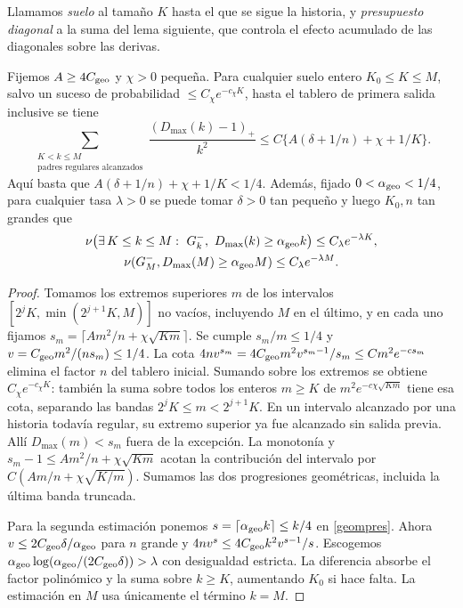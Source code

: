 Llamamos \emph{suelo} al tamaño $K$ hasta el que se sigue la historia, y \emph{presupuesto diagonal}
a la suma del lema siguiente, que controla el efecto acumulado de las diagonales sobre las derivas.
\begin{lema}\label{lema:presupuesto-meso}
Fijemos $A\ge4C_{\rm geo}$ y $\chi>0$ pequeña. Para cualquier suelo entero $K_0\le K\le M$, salvo un
suceso de probabilidad $\le C_\chi e^{-c_\chi K}$, hasta el tablero de primera salida inclusive se
tiene
\[
 \sum_{\substack{K<k\le M\\\text{padres regulares alcanzados}}}
          \frac{(D_{\max}(k)-1)_+}{k^2}
 \le C\{A(\delta+1/n)+\chi+1/K\}.
\]
Aquí basta que $A(\delta+1/n)+\chi+1/K<1/4$. Además, fijado $0<\alpha_{\rm geo}<1/4$, para cualquier tasa
$\lambda>0$ se puede tomar $\delta>0$ tan pequeño y luego $K_0,n$ tan grandes que
\begin{gather*}
 \nu\big(\exists\,K\le k\le M:\ G_k^-,\ D_{\max}(k)\ge\alpha_{\rm geo} k\big)
 \le C_\lambda e^{-\lambda K},\\
 \nu(G_M^-,D_{\max}(M)\ge\alpha_{\rm geo} M)\le C_\lambda e^{-\lambda M}.
\end{gather*}
\end{lema}
\begin{proof}
Tomamos los extremos superiores $m$ de los intervalos $[2^jK,\min(2^{j+1}K,M)]$ no vacíos, incluyendo
$M$ en el último, y en cada uno fijamos $s_m=\lceil Am^2/n+\chi\sqrt{Km}\rceil$. Se cumple
$s_m/m\le1/4$ y $v=C_{\rm geo}m^2/(ns_m)\le1/4$. La cota
$4nv^{s_m}=4C_{\rm geo}m^2v^{s_m-1}/s_m\le C m^2e^{-c s_m}$
elimina el factor $n$ del tablero inicial. Sumando sobre los extremos se obtiene
$C_\chi e^{-c_\chi K}$: también la suma sobre todos los enteros $m\ge K$ de
$m^2e^{-c\chi\sqrt{Km}}$ tiene esa cota,
separando las bandas $2^jK\le m<2^{j+1}K$. En un intervalo alcanzado por una historia todavía regular,
su extremo superior ya fue alcanzado sin salida previa. Allí $D_{\max}(m)<s_m$ fuera de la excepción.
La monotonía y $s_m-1\le Am^2/n+\chi\sqrt{Km}$ acotan la contribución del intervalo por
$C(Am/n+\chi\sqrt{K/m})$. Sumamos las dos progresiones geométricas, incluida la última banda
truncada.

Para la segunda estimación ponemos $s=\lceil\alpha_{\rm geo} k\rceil\le k/4$ en \eqref{geompres}.
Ahora $v\le
2C_{\rm geo}\delta/\alpha_{\rm geo}$ para $n$ grande y $4nv^s\le4C_{\rm geo} k^2v^{s-1}/s$. Escogemos
$\alpha_{\rm geo}\log(\alpha_{\rm geo}/(2C_{\rm geo}\delta))>\lambda$ con desigualdad estricta. La
diferencia absorbe el
factor polinómico
y la suma sobre $k\ge K$, aumentando $K_0$ si hace falta. La estimación en $M$ usa únicamente el
término $k=M$.
\end{proof}

